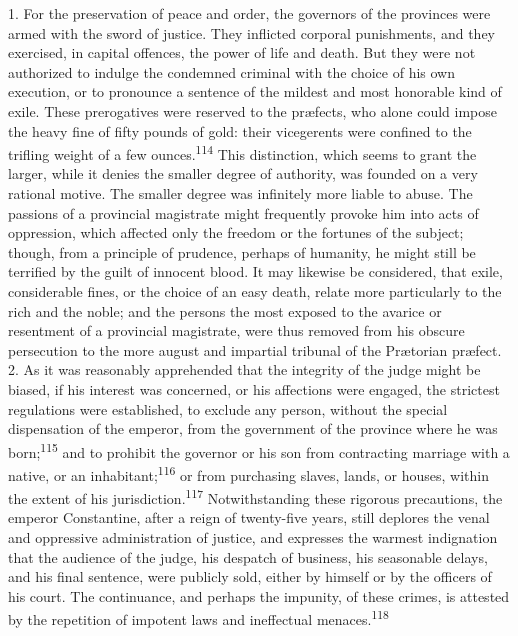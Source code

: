 1. For the preservation of peace and order, the governors of the
provinces were armed with the sword of justice. They inflicted
corporal punishments, and they exercised, in capital offences,
the power of life and death. But they were not authorized to
indulge the condemned criminal with the choice of his own
execution, or to pronounce a sentence of the mildest and most
honorable kind of exile. These prerogatives were reserved to the
præfects, who alone could impose the heavy fine of fifty pounds
of gold: their vicegerents were confined to the trifling weight
of a few ounces.\textsuperscript{114} This distinction, which seems to grant the
larger, while it denies the smaller degree of authority, was
founded on a very rational motive. The smaller degree was
infinitely more liable to abuse. The passions of a provincial
magistrate might frequently provoke him into acts of oppression,
which affected only the freedom or the fortunes of the subject;
though, from a principle of prudence, perhaps of humanity, he
might still be terrified by the guilt of innocent blood. It may
likewise be considered, that exile, considerable fines, or the
choice of an easy death, relate more particularly to the rich and
the noble; and the persons the most exposed to the avarice or
resentment of a provincial magistrate, were thus removed from his
obscure persecution to the more august and impartial tribunal of
the Prætorian præfect. 2. As it was reasonably apprehended that
the integrity of the judge might be biased, if his interest was
concerned, or his affections were engaged, the strictest
regulations were established, to exclude any person, without the
special dispensation of the emperor, from the government of the
province where he was born;\textsuperscript{115} and to prohibit the governor or
his son from contracting marriage with a native, or an
inhabitant;\textsuperscript{116} or from purchasing slaves, lands, or houses,
within the extent of his jurisdiction.\textsuperscript{117} Notwithstanding these
rigorous precautions, the emperor Constantine, after a reign of
twenty-five years, still deplores the venal and oppressive
administration of justice, and expresses the warmest indignation
that the audience of the judge, his despatch of business, his
seasonable delays, and his final sentence, were publicly sold,
either by himself or by the officers of his court. The
continuance, and perhaps the impunity, of these crimes, is
attested by the repetition of impotent laws and ineffectual
menaces.\textsuperscript{118}


